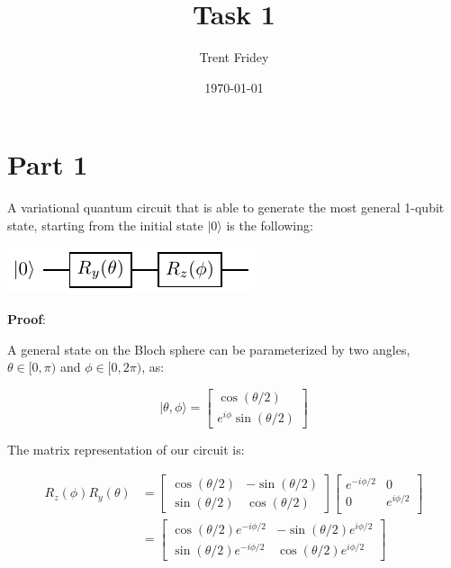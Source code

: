 \documentclass[11pt]{article}
\author{Trent Fridey}
\date{\today}
\title{Task 1}
\begin{document}
\maketitle
\tableofcontents

\pagebreak

\section{Part 1}
\label{sec:org547f5d1}

A variational quantum circuit that is able to generate the most general 1-qubit state, starting from the initial state \(|0\rangle\) is the following:

\begin{center}
\includegraphics[width=.9\linewidth]{circuits/variational/variational.pdf}
\end{center}

\textbf{\textbf{Proof}}:

A general state on the Bloch sphere can be parameterized by two angles, \(\theta \in [0,\pi)\) and \(\phi \in [0,2\pi)\), as:

\begin{equation*}
| \theta, \phi \rangle =
\begin{bmatrix}
\cos(\theta/2) \\
e^{i\phi}\sin(\theta/2)
\end{bmatrix}
\end{equation*}


The matrix representation of our circuit is:

\begin{align*}
R_z(\phi)R_y(\theta) &= 
\begin{bmatrix}
\cos(\theta/2) & -\sin(\theta/2) \\
\sin(\theta/2) & \cos(\theta/2)
\end{bmatrix}
\begin{bmatrix}
e^{-i\phi/2} & 0 \\
0 & e^{i\phi/2}  \\
\end{bmatrix} \\
&=
\begin{bmatrix}
\cos(\theta/2)e^{-i\phi/2} & -\sin(\theta/2)e^{i\phi/2} \\
\sin(\theta/2)e^{-i\phi/2} & \cos(\theta/2)e^{i\phi/2}
\end{bmatrix}
\end{align*}
\end{document}
